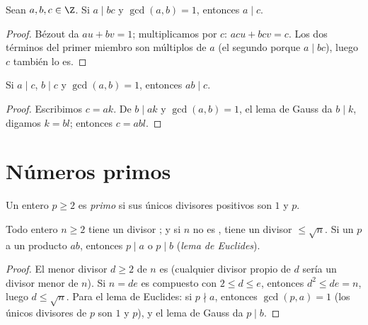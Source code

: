 \begin{theorem}\label{thm:g12:arith:gauss}
Sean $a, b, c \in \Z$. Si $a \mid bc$ y $\gcd(a, b) = 1$, entonces
$a \mid c$.
\end{theorem}

\begin{proof}
Bézout da $au + bv = 1$; multiplicamos por $c$: $acu + bcv = c$. Los dos
términos del primer miembro son múltiplos de $a$ (el segundo porque
$a \mid bc$), luego $c$ también lo es.
\end{proof}

\begin{corollary}\label{cor:g12:arith:coprimeprod}
Si $a \mid c$, $b \mid c$ y $\gcd(a,b) = 1$, entonces $ab \mid c$.
\end{corollary}

\begin{proof}
Escribimos $c = ak$. De $b \mid ak$ y $\gcd(a,b)=1$, el lema de Gauss da
$b \mid k$, digamos $k = bl$; entonces $c = abl$.
\end{proof}

\section{Números primos}

\begin{definition}[Primo]\label{def:g12:arith:prime}
Un entero $p \geq 2$ es \emph{primo} si sus únicos
divisores positivos son $1$ y $p$.
\end{definition}

\begin{proposition}\label{prop:g12:arith:primedivides}
Todo entero $n \geq 2$ tiene un divisor ; y si $n$ no es , tiene
un divisor  $\leq \sqrt n$. Si un  $p$  a un producto $ab$,
entonces $p \mid a$ o $p \mid b$ (\emph{lema de Euclides}).
\end{proposition}

\begin{proof}
El menor divisor $d \geq 2$ de $n$ es  (cualquier divisor propio de
$d$ sería un divisor menor de $n$). Si $n = de$ es compuesto con
$2 \leq d \leq e$, entonces $d^2 \leq de = n$, luego $d \leq \sqrt n$. Para
el lema de Euclides: si $p \nmid a$, entonces $\gcd(p, a) = 1$ (los únicos
divisores de $p$ son $1$ y $p$), y el lema de Gauss da $p \mid b$.
\end{proof}

